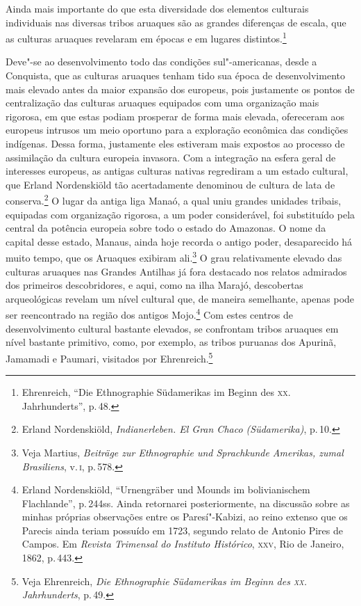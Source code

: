 Ainda mais importante do que esta diversidade dos elementos culturais
individuais nas diversas tribos aruaques são as grandes diferenças de
escala, que as culturas aruaques revelaram em épocas e em lugares
distintos.\footnote{Ehrenreich, ``Die Ethnographie Südamerikas im Beginn
  des \textsc{xx}. Jahrhunderts'', p.\,48.}

Deve"-se ao desenvolvimento todo das condições sul"-americanas, desde a
Conquista, que as culturas aruaques tenham tido sua época de desenvolvimento
mais elevado antes da maior expansão dos europeus, pois justamente os
pontos de centralização das culturas aruaques equipados com uma
organização mais rigorosa, em que estas podiam prosperar de forma mais
elevada, ofereceram aos europeus intrusos um meio oportuno para a
exploração econômica das condições indígenas. Dessa forma, justamente
eles estiveram mais expostos ao processo de assimilação da cultura
europeia invasora. Com a integração na esfera geral de interesses
europeus, as antigas culturas nativas regrediram a um estado cultural,
que Erland Nordenskiöld tão acertadamente denominou de cultura de lata
de conserva.\footnote{Erland Nordenskiöld, \textit{Indianerleben. El Gran
  Chaco (Südamerika)}, p.\,10.} O lugar da antiga liga Manaó, a
qual uniu grandes unidades tribais, equipadas com organização rigorosa,
a um poder considerável, foi substituído pela central da potência
europeia sobre todo o estado do Amazonas. O nome da capital desse
estado, Manaus, ainda hoje recorda o antigo poder, desaparecido há muito
tempo, que os Aruaques exibiram ali.\footnote{Veja Martius, \textit{Beiträge
  zur Ethnographie und Sprachkunde Amerikas, zumal Brasiliens}, v.\,\textsc{i}, p.\,578.} O grau relativamente elevado das culturas aruaques nas Grandes
Antilhas já fora destacado nos relatos admirados dos primeiros
descobridores, e aqui, como na ilha Marajó, descobertas arqueológicas
revelam um nível cultural que, de maneira semelhante, apenas pode ser
reencontrado na região dos antigos Mojo.\footnote{Erland Nordenskiöld,
  ``Urnengräber und Mounds im bolivianischem Flachlande'', p.\,244ss. Ainda retornarei posteriormente, na discussão sobre as minhas
próprias observações entre os Paresí"-Kabizi, ao reino extenso que os
Parecis ainda teriam possuído em 1723, segundo relato de Antonio Pires
de Campos. Em \textit{Revista Trimensal do Instituto Histórico}, \textsc{xxv},
  Rio de Janeiro, 1862, p.\,443.} Com estes centros de desenvolvimento
cultural bastante elevados, se confrontam tribos aruaques em nível
bastante primitivo, como, por exemplo, as tribos puruanas dos Apurinã,
Jamamadi e Paumari, visitados por Ehrenreich.\footnote{Veja Ehrenreich,
  \textit{Die Ethnographie Südamerikas im Beginn des \textsc{xx}. Jahrhunderts}, p.\,49.}

